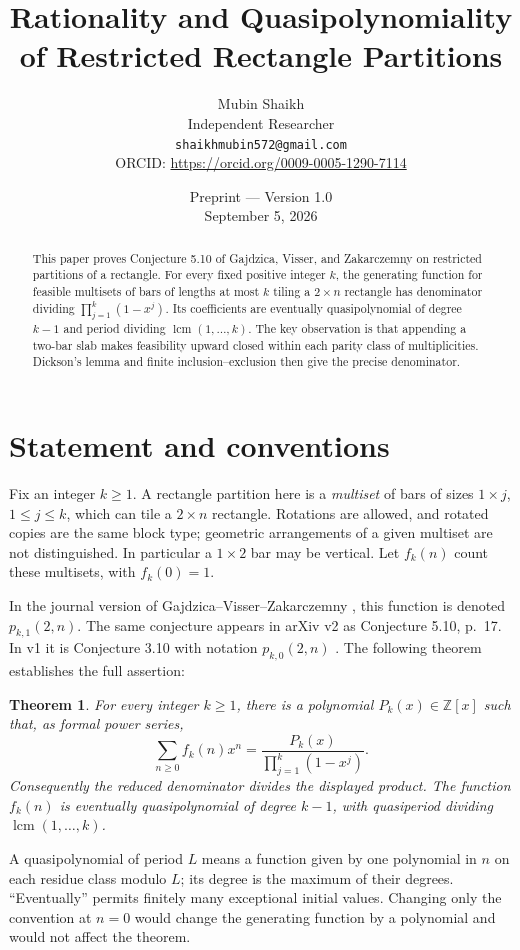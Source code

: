 \documentclass[11pt]{article}
\title{Rationality and Quasipolynomiality of Restricted Rectangle Partitions}
\author{Mubin Shaikh\\
\small Independent Researcher\\
\small\texttt{shaikhmubin572@gmail.com}\\
\small ORCID: \href{https://orcid.org/0009-0005-1290-7114}{https://orcid.org/0009-0005-1290-7114}}
\date{Preprint --- Version 1.0\\September 5, 2026}
\newtheorem{theorem}{Theorem}
\begin{document}
\maketitle
\begin{abstract}
This paper proves Conjecture 5.10 of Gajdzica, Visser, and Zakarczemny on
restricted partitions of a rectangle. For every fixed positive integer
$k$, the generating function for feasible multisets of bars of lengths
at most $k$ tiling a $2\times n$ rectangle has denominator dividing
$\prod_{j=1}^k(1-x^j)$. Its coefficients are eventually quasipolynomial
of degree $k-1$ and period dividing $\operatorname{lcm}(1,\ldots,k)$.
The key observation is that appending a two-bar slab makes feasibility
upward closed within each parity class of multiplicities. Dickson's
lemma and finite inclusion--exclusion then give the precise denominator.
\end{abstract}

\section{Statement and conventions}
Fix an integer $k\geq1$. A rectangle partition here is a \emph{multiset}
of bars of sizes $1\times j$, $1\leq j\leq k$, which can tile a
$2\times n$ rectangle. Rotations are allowed, and rotated copies are
the same block type; geometric arrangements of a given multiset are
not distinguished. In particular a $1\times2$ bar may be vertical.
Let $f_k(n)$ count these multisets, with $f_k(0)=1$.

In the journal version of Gajdzica--Visser--Zakarczemny
\cite[Section 5.1, Conjecture 5.10]{GVZ}, this function is denoted
$p_{k,1}(2,n)$. The same conjecture appears in arXiv v2 as
Conjecture 5.10, p.~17. In v1 it is Conjecture 3.10 with notation
$p_{k,0}(2,n)$ \cite{pre}. The following theorem establishes the full assertion:
\begin{theorem}\label{thm:main}
For every integer $k\geq1$, there is a polynomial $P_k(x)\in\mathbb Z[x]$
such that, as formal power series,
\begin{equation}\label{eq:gf}
 \sum_{n\geq0} f_k(n)x^n
 =\frac{P_k(x)}{\prod_{j=1}^k(1-x^j)}.
\end{equation}
Consequently the reduced denominator divides the displayed product.
The function $f_k(n)$ is eventually quasipolynomial of degree $k-1$,
with quasiperiod dividing $\operatorname{lcm}(1,\ldots,k)$.
\end{theorem}
A quasipolynomial of period $L$ means a function given by one polynomial
in $n$ on each residue class modulo $L$; its degree is the maximum of
their degrees. ``Eventually'' permits finitely many exceptional initial
values. Changing only the convention at $n=0$ would change the generating
function by a polynomial and would not affect the theorem.
\end{document}
